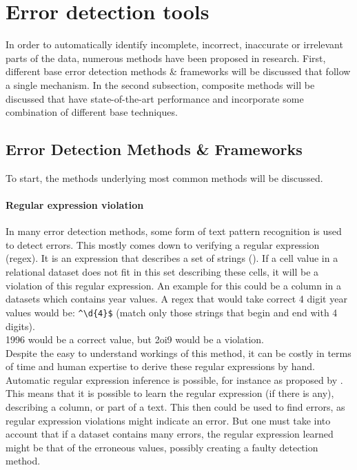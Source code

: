 \section{Error detection tools}
\label{sec:error_detection_tools}
In order to automatically identify incomplete, incorrect, inaccurate or irrelevant parts of the data, numerous methods have been proposed in research. First, different base error detection methods \& frameworks will be discussed that follow a single mechanism. In the second subsection, composite methods will be discussed that have state-of-the-art performance and incorporate some combination of different base techniques.

\subsection{Error Detection Methods \& Frameworks}
To start, the methods underlying most common methods will be discussed.

\paragraph{Regular expression violation}
In many error detection methods, some form of text pattern recognition is used to detect errors. This mostly comes down to verifying a regular expression (regex). It is an expression that describes a set of strings (\cite{Mitkov2004-fz}). If a cell value in a relational dataset does not fit in this set describing these cells, it will be a violation of this regular expression. An example for this could be a column in a datasets which contains year values. A regex that would take correct 4 digit year values would be: \verb|^\d{4}$| (match only those strings that begin and end with 4 digits). 
\\1996 would be a correct value, but 2oi9 would be a violation. 
\\Despite the easy to understand workings of this method, it can be costly in terms of time and human expertise to derive these regular expressions by hand.
Automatic regular expression inference is possible, for instance as proposed by \cite{Bartoli2016-hx}. This means that it is possible to learn the regular expression (if there is any), describing a column, or part of a text. This then could be used to find errors, as regular expression violations might indicate an error. But one must take into account that if a dataset contains many errors, the regular expression learned might be that of the erroneous values, possibly creating a faulty detection method.
    
